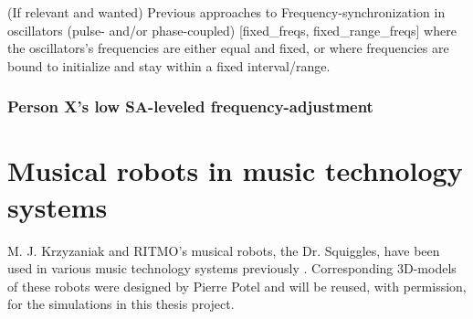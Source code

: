 	
	(If relevant and wanted) \nl
	Previous approaches to Frequency-synchronization in oscillators (pulse- and/or phase-coupled) [fixed\_freqs, fixed\_range\_freqs] where the oscillators's frequencies are either equal and fixed, or where frequencies are bound to initialize and stay within a fixed interval/range.
	
	
	\subsubsection{Person X's low SA-leveled frequency-adjustment}
	
	
	
	


\section{Musical robots in music technology systems}

	M. J. Krzyzaniak and RITMO's musical robots, the Dr. Squiggles, have been used in various music technology systems previously \cite{dr_squiggles}. Corresponding 3D-models of these robots were designed by Pierre Potel \cite{pierre_potel} and will be reused, with permission, for the simulations in this thesis project.